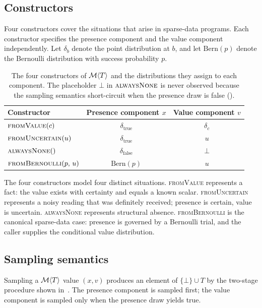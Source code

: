 \subsection{Constructors}
\label{sec:type:ctors}

Four constructors cover the situations that arise in sparse-data programs.
Each constructor specifies the presence component and the value component
independently. Let $\delta_b$ denote the point distribution at $b$, and let
$\mathrm{Bern}(p)$ denote the Bernoulli distribution with success
probability $p$.

\begin{table}[h]
\centering
\small
\begin{tabular}{@{}lcc@{}}
\toprule
Constructor & Presence component $x$ & Value component $v$ \\
\midrule
$\textsc{fromValue}(c)$              & $\delta_{\text{true}}$ & $\delta_c$ \\
$\textsc{fromUncertain}(u)$          & $\delta_{\text{true}}$ & $u$ \\
$\textsc{alwaysNone}()$              & $\delta_{\text{false}}$ & $\bot$ \\
$\textsc{fromBernoulli}(p,\, u)$     & $\mathrm{Bern}(p)$ & $u$ \\
\bottomrule
\end{tabular}
\caption{The four constructors of $\mathcal{M}\langle T \rangle$ and the
distributions they assign to each component. The placeholder $\bot$ in
$\textsc{alwaysNone}$ is never observed because the sampling semantics
short-circuit when the presence draw is false ().}
\label{tab:constructors}
\end{table}

The four constructors model four distinct situations. \textsc{fromValue}
represents a fact: the value exists with certainty and equals a known
scalar. \textsc{fromUncertain} represents a noisy reading that was definitely
received; presence is certain, value is uncertain. \textsc{alwaysNone}
represents structural absence. \textsc{fromBernoulli} is the canonical
sparse-data case: presence is governed by a Bernoulli trial, and the
caller supplies the conditional value distribution.

\subsection{Sampling semantics}
\label{sec:type:sampling}

Sampling a $\mathcal{M}\langle T \rangle$ value $(x, v)$ produces an element of
$\{\bot\} \cup T$ by the two-stage procedure shown
in~. The presence component is sampled first; the value
component is sampled only when the presence draw yields true.

